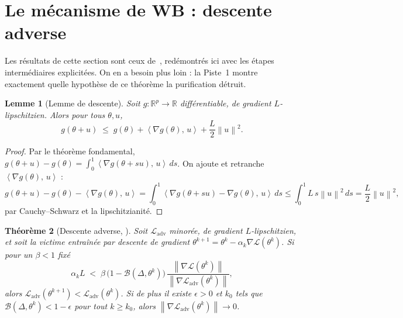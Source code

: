 \documentclass[11pt,a4paper]{article}
\theoremstyle{plain}
\newtheorem{theorem}{Théorème}[section]
\newtheorem{lemma}[theorem]{Lemme}
\theoremstyle{definition}
\theoremstyle{remark}
\newcommand{\R}{\mathbb{R}}
\newcommand{\Loss}{\mathcal{L}}
\newcommand{\Ladv}{\mathcal{L}_{\mathrm{adv}}}
\newcommand{\B}{\mathcal{B}}
\newcommand{\norm}[1]{\left\lVert #1 \right\rVert}
\newcommand{\inner}[2]{\left\langle #1,\, #2 \right\rangle}
\newcommand{\grad}{\nabla}
\begin{document}
\section{Le mécanisme de WB : descente adverse}

Les résultats de cette section sont ceux de~\cite[Prop.~1 et App.~C]{geiping2021}, redémontrés ici
avec les étapes intermédiaires explicitées. On en a besoin plus loin : la Piste~1 montre
exactement quelle hypothèse de ce théorème la purification détruit.

\begin{lemma}[Lemme de descente]\label{lem:descent}
Soit $g:\R^p\to\R$ différentiable, de gradient $L$-lipschitzien. Alors pour tous $\theta,u$,
\[
g(\theta+u)\;\le\;g(\theta)+\inner{\grad g(\theta)}{u}+\frac{L}{2}\norm{u}^2 .
\]
\end{lemma}
\begin{proof}
Par le théorème fondamental, $g(\theta+u)-g(\theta)=\int_0^1\inner{\grad g(\theta+su)}{u}\,ds$.
On ajoute et retranche $\inner{\grad g(\theta)}{u}$ :
\[
g(\theta+u)-g(\theta)-\inner{\grad g(\theta)}{u}
=\int_0^1\inner{\grad g(\theta+su)-\grad g(\theta)}{u}\,ds
\le\int_0^1 L\,s\norm{u}^2\,ds=\frac L2\norm{u}^2,
\]
par Cauchy--Schwarz et la lipschitzianité.
\end{proof}

\begin{theorem}[Descente adverse, {\cite[Prop.~1]{geiping2021}}]\label{thm:adv-descent}
Soit $\Ladv$ minorée, de gradient $L$-lipschitzien, et soit la victime entraînée par descente de
gradient $\theta^{k+1}=\theta^k-\alpha_k\grad\Loss(\theta^k)$. Si pour un $\beta<1$ fixé
\begin{equation}\label{eq:cond}
\alpha_k L\;<\;\beta\,\big(1-\B(\Delta,\theta^k)\big)\,\frac{\norm{\grad\Loss(\theta^k)}}{\norm{\grad\Ladv(\theta^k)}},
\end{equation}
alors $\Ladv(\theta^{k+1})<\Ladv(\theta^k)$. Si de plus il existe $\epsilon>0$ et $k_0$ tels que
$\B(\Delta,\theta^k)<1-\epsilon$ pour tout $k\ge k_0$, alors $\norm{\grad\Ladv(\theta^k)}\to0$.
\end{theorem}
\end{document}
